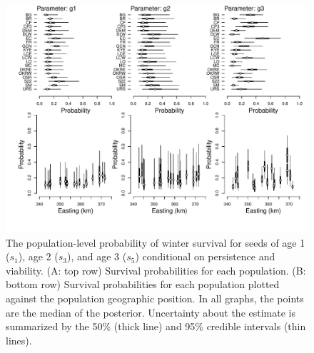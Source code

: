 \documentclass[12pt, oneside]{article}   	%
\begin{document}
 \begin{figure}[!h]
        \centering
        \includegraphics[page=2,width=\textwidth]{../../figures/structured-parameters-all.pdf} 
            \caption{ The population-level probability of winter survival for seeds of age 1 ($s_1$), age 2 ($s_3$), and age 3 ($s_5$) conditional on persistence and viability. (A: top row) Survival probabilities for each population. (B: bottom row) Survival probabilities for each population plotted against the population geographic position. In all graphs, the points are the median of the posterior. Uncertainty about the estimate is summarized by the 50\% (thick line) and 95\% credible intervals (thin lines). }
 \label{fig:germination-estimates-population}
\end{figure}
\end{document}
